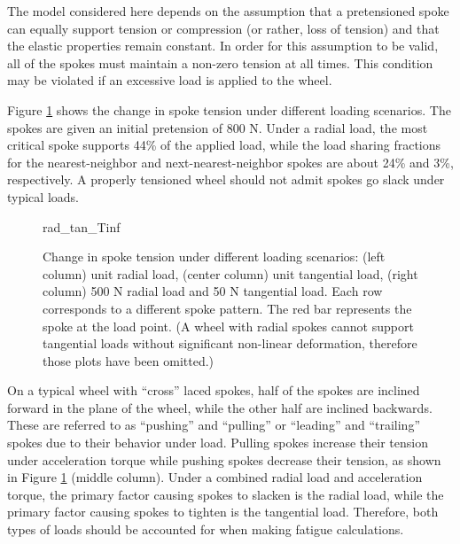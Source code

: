 \documentclass[\rootdir/thesis.tex]{subfiles}
\begin{document}
The model considered here depends on the assumption that a pretensioned spoke can equally support tension or compression (or rather, loss of tension) and that the elastic properties remain constant. In order for this assumption to be valid, all of the spokes must maintain a non-zero tension at all times. This condition may be violated if an excessive load is applied to the wheel.

Figure \ref{fig:radtan_Tinf} shows the change in spoke tension under different loading scenarios. The spokes are given an initial pretension of 800 N. Under a radial load, the most critical spoke supports 44\% of the applied load, while the load sharing fractions for the nearest-neighbor and next-nearest-neighbor spokes are about 24\% and 3\%, respectively. A properly tensioned wheel should not admit spokes go slack under typical loads.

\begin{figure}[h]
\centering
{rad_tan_Tinf}
\caption{Change in spoke tension under different loading scenarios: (left column) unit radial load, (center column) unit tangential load, (right column) 500 N radial load and 50 N tangential load. Each row corresponds to a different spoke pattern. The red bar represents the spoke at the load point. (A wheel with radial spokes cannot support tangential loads without significant non-linear deformation, therefore those plots have been omitted.)}
\label{fig:radtan_Tinf}
\end{figure}

On a typical wheel with ``cross'' laced spokes, half of the spokes are inclined forward in the plane of the wheel, while the other half are inclined backwards. These are referred to as ``pushing'' and ``pulling'' or ``leading'' and ``trailing'' spokes due to their behavior under load. Pulling spokes increase their tension under acceleration torque while pushing spokes decrease their tension, as shown in Figure \ref{fig:radtan_Tinf} (middle column). Under a combined radial load and acceleration torque, the primary factor causing spokes to slacken is the radial load, while the primary factor causing spokes to tighten is the tangential load. Therefore, both types of loads should be accounted for when making fatigue calculations.
\end{document}
